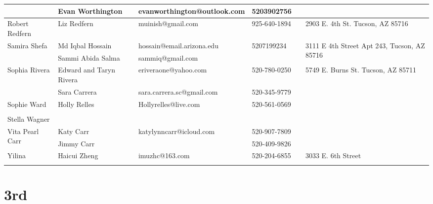 \documentclass[landscape]{article}\usepackage[]{graphicx}\usepackage[]{color}
\begin{document}
\begin{longtable}{|p{100pt}|p{100pt}|p{140pt}|p{60pt}|p{64pt}|p{120pt}|}
 & Evan Worthington & evanworthington@outlook.com & 5203902756 &  & \\
\hline
\multirow{2}{100pt}{Robert Redfern} & Liz Redfern & muinish@gmail.com & 925-640-1894 &  & \multirow{2}{120pt}{2903 E. 4th St. Tucson, AZ 85716} \\
 &  &  &  &  & \\
\hline
\multirow{2}{100pt}{Samira Shefa} & Md Iqbal Hossain & hossain@email.arizona.edu & 5207199234 &  & \multirow{2}{120pt}{3111 E 4th Street Apt 243, Tucson, AZ 85716} \\
 & Sammi Abida Salma & sammiq@gmail.com &  &  & \\
\hline
\multirow{2}{100pt}{Sophia Rivera} & Edward and Taryn Rivera & eriveraone@yahoo.com & 520-780-0250 &  & \multirow{2}{120pt}{5749 E. Burns St. Tucson, AZ 85711} \\
 & Sara Carrera & sara.carrera.sc@gmail.com & 520-345-9779 &  & \\
\hline
\multirow{2}{100pt}{Sophie Ward} & Holly Relles & Hollyrelles@live.com & 520-561-0569 &  & \multirow{2}{120pt}{} \\
 &  &  &  &  & \\
\hline
\multirow{2}{100pt}{Stella Wagner} &  &  &  &  & \multirow{2}{120pt}{} \\
 &  &  &  &  & \\
\hline
\multirow{2}{100pt}{Vita Pearl Carr} & Katy Carr & katylynncarr@icloud.com & 520-907-7809 &  & \multirow{2}{120pt}{} \\
 & Jimmy Carr &  & 520-409-9826 &  & \\
\hline
\multirow{2}{100pt}{Yilina} & Haicui Zheng & imuzhc@163.com & 520-204-6855 &  & \multirow{2}{120pt}{3033 E. 6th Street} \\
 &  &  &  &  & \\
\hline
\end{longtable}
\newpage
\section{3rd}
\end{document}
